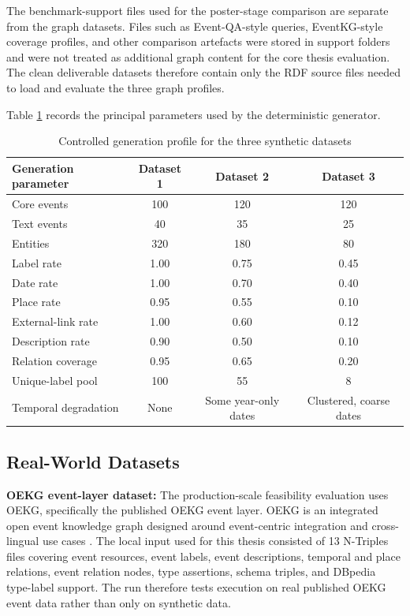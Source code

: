 The benchmark-support files used for the poster-stage comparison are separate from the graph datasets. Files such as Event-QA-style queries, EventKG-style coverage profiles, and other comparison artefacts were stored in support folders and were not treated as additional graph content for the core thesis evaluation. The clean deliverable datasets therefore contain only the RDF source files needed to load and evaluate the three graph profiles.

Table \ref{tab:synthetic_generation_profile} records the principal parameters used by the deterministic generator.

\begin{table}[H]
\centering
\caption{Controlled generation profile for the three synthetic datasets}
\label{tab:synthetic_generation_profile}
\scriptsize
\begin{tabular}{lccc}
\toprule
Generation parameter & Dataset 1 & Dataset 2 & Dataset 3 \\
\midrule
Core events & 100 & 120 & 120 \\
Text events & 40 & 35 & 25 \\
Entities & 320 & 180 & 80 \\
Label rate & 1.00 & 0.75 & 0.45 \\
Date rate & 1.00 & 0.70 & 0.40 \\
Place rate & 0.95 & 0.55 & 0.10 \\
External-link rate & 1.00 & 0.60 & 0.12 \\
Description rate & 0.90 & 0.50 & 0.10 \\
Relation coverage & 0.95 & 0.65 & 0.20 \\
Unique-label pool & 100 & 55 & 8 \\
Temporal degradation & None & Some year-only dates & Clustered, coarse dates \\
\bottomrule
\end{tabular}
\end{table}

\subsection{Real-World Datasets}

\textbf{OEKG event-layer dataset:} The production-scale feasibility evaluation uses OEKG, specifically the published OEKG event layer. OEKG is an integrated open event knowledge graph designed around event-centric integration and cross-lingual use cases \citep{oekg2023}. The local input used for this thesis consisted of 13 N-Triples files covering event resources, event labels, event descriptions, temporal and place relations, event relation nodes, type assertions, schema triples, and DBpedia type-label support. The run therefore tests execution on real published OEKG event data rather than only on synthetic data.

